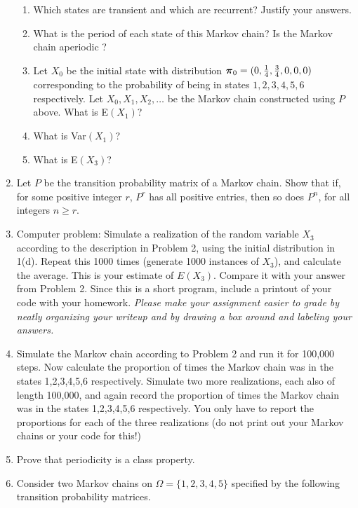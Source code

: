 \documentclass{article}
\begin{document}
\begin{enumerate}
\begin{enumerate}
\item Which states are transient and which are recurrent? Justify your answers. 
\item What is the period of each state of this Markov chain? Is the Markov chain aperiodic ? 
\item Let $X_0$ be the initial state with distribution $\mbox{\boldmath $\pi$}_0 = (0, \frac{1}{4},
\frac{3}{4}, 0, 0, 0)$ corresponding to the probability of
being in states $ 1, 2, 3,
4, 5, 6$ respectively.  Let $X_0, X_1, X_2,\dots$ be the Markov chain constructed using $P$ above. What is E$(X_1)$?
\item What is Var$(X_1)$?
\item What is E$(X_3)$? %
\end{enumerate} 
\item Let $P$ be the transition probability matrix of a Markov chain. Show that if, for some positive integer $r$, $P^r$ has all positive entries, then so does $P^n$, for all integers $n\geq r$.
\item Computer problem: Simulate a realization of the random variable
  $X_3$ according to the description in Problem 2, using the initial
  distribution in 1(d). Repeat this 1000 times (generate 1000
  instances of $X_3$), and calculate the average. This is your
  estimate of $E(X_3)$. Compare it with your answer from Problem 2.
  Since this is a short program, include a printout of your code with
  your homework. {\it Please make your assignment easier to grade by
    neatly organizing your writeup and by drawing a box around and
    labeling your answers.}
\item Simulate the Markov chain according to Problem 2 and run it for
  100,000 steps.  Now calculate the proportion of times the Markov
  chain was in the states 1,2,3,4,5,6 respectively. Simulate two more
  realizations, each also of length 100,000, and again record the
  proportion of times the Markov chain was in the states 1,2,3,4,5,6
  respectively.  You only have to report the proportions for each of
  the three realizations (do not print out your Markov chains or your
  code for this!)
\newpage
\item Prove that periodicity is a class property.
\item Consider two Markov chains on $\Omega=\{1, 2, 3, 4, 5\}$ specified by the following transition probability matrices.

\end{enumerate}
\end{document}
